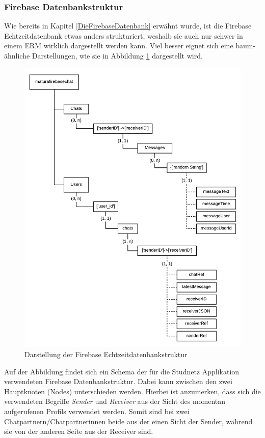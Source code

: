 \documentclass[../main.tex]{subfiles}
\begin{document}
	\subsubsection{Firebase Datenbankstruktur}
	Wie bereits in Kapitel \ref{DieFirebaseDatenbank} erwähnt wurde, ist die Firebase Echtzeitdatenbank etwas anders strukturiert, weshalb sie auch nur schwer in einem ERM wirklich dargestellt werden kann. Viel besser eignet sich eine baum-ähnliche Darstellungen, wie sie in Abbildung \ref{firebaseTree} dargestellt wird. 
	\begin{figure} 
		\centering
		\includegraphics[width=\textwidth]{./images/FirebaseStructure.pdf}
		\caption{Darstellung der Firebase Echtzeitdatenbankstruktur}
		\label{firebaseTree}
	\end{figure}
	Auf der Abbildung findet sich ein Schema der für die Studnetz Applikation verwendeten Firebase Datenbankstruktur. Dabei kann zwischen den zwei Hauptknoten (Nodes) unterschieden werden. Hierbei ist anzumerken, dass sich die verwendeten Begriffe \emph{Sender} und \emph{Receiver} aus der Sicht des momentan aufgerufenen Profils verwendet werden. Somit sind bei zwei Chatpartnern/Chatpartnerinnen beide aus der einen Sicht der Sender, während sie von der anderen Seite aus der Receiver sind.
	
\end{document}
